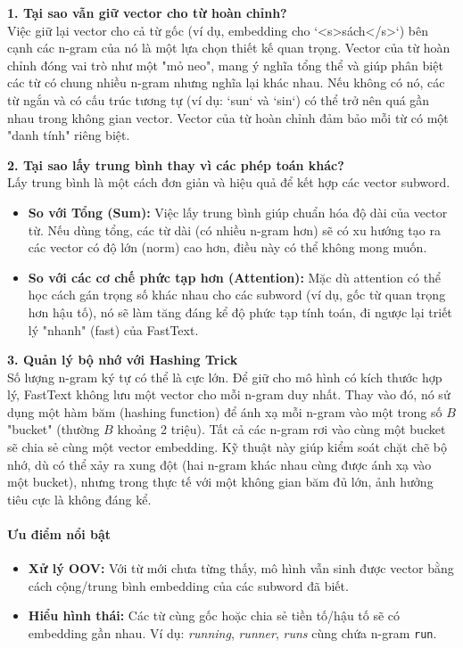 \begin{tcolorbox}[
    title=Ghi chú sâu về Biểu diễn Subword,
    colback=green!5!white, colframe=green!50!black, fonttitle=\bfseries
]
\textbf{1. Tại sao vẫn giữ vector cho từ hoàn chỉnh?} \\
Việc giữ lại vector cho cả từ gốc (ví dụ, embedding cho `<s>sách</s>`) bên cạnh các n-gram của nó là một lựa chọn thiết kế quan trọng. Vector của từ hoàn chỉnh đóng vai trò như một "mỏ neo", mang ý nghĩa tổng thể và giúp phân biệt các từ có chung nhiều n-gram nhưng nghĩa lại khác nhau. Nếu không có nó, các từ ngắn và có cấu trúc tương tự (ví dụ: `sun` và `sin`) có thể trở nên quá gần nhau trong không gian vector. Vector của từ hoàn chỉnh đảm bảo mỗi từ có một "danh tính" riêng biệt.

\textbf{2. Tại sao lấy trung bình thay vì các phép toán khác?} \\
Lấy trung bình là một cách đơn giản và hiệu quả để kết hợp các vector subword.
\begin{itemize}
    \item \textbf{So với Tổng (Sum):} Việc lấy trung bình giúp chuẩn hóa độ dài của vector từ. Nếu dùng tổng, các từ dài (có nhiều n-gram hơn) sẽ có xu hướng tạo ra các vector có độ lớn (norm) cao hơn, điều này có thể không mong muốn.
    \item \textbf{So với các cơ chế phức tạp hơn (Attention):} Mặc dù attention có thể học cách gán trọng số khác nhau cho các subword (ví dụ, gốc từ quan trọng hơn hậu tố), nó sẽ làm tăng đáng kể độ phức tạp tính toán, đi ngược lại triết lý "nhanh" (fast) của FastText.
\end{itemize}

\textbf{3. Quản lý bộ nhớ với Hashing Trick} \\
Số lượng n-gram ký tự có thể là cực lớn. Để giữ cho mô hình có kích thước hợp lý, FastText không lưu một vector cho mỗi n-gram duy nhất. Thay vào đó, nó sử dụng một hàm băm (hashing function) để ánh xạ mỗi n-gram vào một trong số $B$ "bucket" (thường $B$ khoảng 2 triệu). Tất cả các n-gram rơi vào cùng một bucket sẽ chia sẻ cùng một vector embedding. Kỹ thuật này giúp kiểm soát chặt chẽ bộ nhớ, dù có thể xảy ra xung đột (hai n-gram khác nhau cùng được ánh xạ vào một bucket), nhưng trong thực tế với một không gian băm đủ lớn, ảnh hưởng tiêu cực là không đáng kể.
\end{tcolorbox}

\paragraph{Ưu điểm nổi bật}
\begin{itemize}
    \item \textbf{Xử lý OOV:} Với từ mới chưa từng thấy, mô hình vẫn sinh được vector bằng cách cộng/trung bình embedding của các subword đã biết.
    \item \textbf{Hiểu hình thái:} Các từ cùng gốc hoặc chia sẻ tiền tố/hậu tố sẽ có embedding gần nhau.  
    Ví dụ: \textit{running}, \textit{runner}, \textit{runs} cùng chứa n-gram \verb|run|.
\end{itemize}

